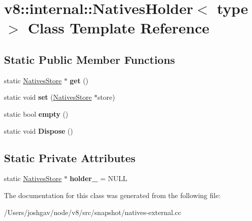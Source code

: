 \hypertarget{classv8_1_1internal_1_1_natives_holder}{}\section{v8\+:\+:internal\+:\+:Natives\+Holder$<$ type $>$ Class Template Reference}
\label{classv8_1_1internal_1_1_natives_holder}
\subsection*{Static Public Member Functions}
\begin{DoxyCompactItemize}
\item 
static \hyperlink{classv8_1_1internal_1_1_natives_store}{Natives\+Store} $\ast$ {\bfseries get} ()\hypertarget{classv8_1_1internal_1_1_natives_holder_a132e470b1bc472fd50433504c0d859e7}{}\label{classv8_1_1internal_1_1_natives_holder_a132e470b1bc472fd50433504c0d859e7}

\item 
static void {\bfseries set} (\hyperlink{classv8_1_1internal_1_1_natives_store}{Natives\+Store} $\ast$store)\hypertarget{classv8_1_1internal_1_1_natives_holder_a9e1d218642005655136a936c63201797}{}\label{classv8_1_1internal_1_1_natives_holder_a9e1d218642005655136a936c63201797}

\item 
static bool {\bfseries empty} ()\hypertarget{classv8_1_1internal_1_1_natives_holder_a97c8f541c2a322374a056b12514a4b2e}{}\label{classv8_1_1internal_1_1_natives_holder_a97c8f541c2a322374a056b12514a4b2e}

\item 
static void {\bfseries Dispose} ()\hypertarget{classv8_1_1internal_1_1_natives_holder_aeef47bb3ec91a0773cad0119f855ac97}{}\label{classv8_1_1internal_1_1_natives_holder_aeef47bb3ec91a0773cad0119f855ac97}

\end{DoxyCompactItemize}
\subsection*{Static Private Attributes}
\begin{DoxyCompactItemize}
\item 
static \hyperlink{classv8_1_1internal_1_1_natives_store}{Natives\+Store} $\ast$ {\bfseries holder\+\_\+} = N\+U\+LL\hypertarget{classv8_1_1internal_1_1_natives_holder_a70dbd7292543f851fb66f5ecb2d3edf9}{}\label{classv8_1_1internal_1_1_natives_holder_a70dbd7292543f851fb66f5ecb2d3edf9}

\end{DoxyCompactItemize}


The documentation for this class was generated from the following file\+:\begin{DoxyCompactItemize}
\item 
/\+Users/joshgav/node/v8/src/snapshot/natives-\/external.\+cc\end{DoxyCompactItemize}
